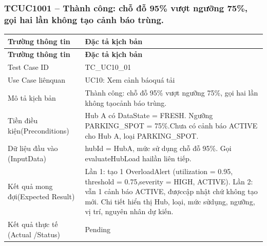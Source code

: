 \subsubsection{TCUC1001 – Thành công: chỗ đỗ 95\% vượt ngưỡng 75\%, gọi hai lần không tạo cảnh báo trùng.}
\begin{longtable}{|L{0.24\textwidth}|L{0.70\textwidth}|}
\hline
\textbf{Trường thông tin} & \textbf{Đặc tả kịch bản} \\
\hline
\endfirsthead
\hline
\textbf{Trường thông tin} & \textbf{Đặc tả kịch bản} \\
\hline
\endhead
Test Case ID & TC\_UC10\_01 \\
\hline
Use Case liênquan & UC10: Xem cảnh báoquá tải \\
\hline
Mô tả kịch bản & Thành công: chỗ đỗ 95\% vượt ngưỡng 75\%, gọi hai lần không tạo\newline cảnh báo trùng. \\
\hline
Tiền điều kiện\newline (Preconditions) & Hub A có DataState = FRESH. Ngưỡng PARKING\_SPOT = 75\%.\newline Chưa có cảnh báo ACTIVE cho Hub A, loại PARKING\_SPOT. \\
\hline
Dữ liệu đầu vào (Input\newline Data) & hubId = HubA, mức sử dụng chỗ đỗ 95\%. Gọi evaluateHubLoad hai\newline lần liên tiếp. \\
\hline
Kết quả mong đợi\newline (Expected Result) & Lần 1: tạo 1 OverloadAlert (utilization = 0.95, threshold = 0.75,\newline severity = HIGH, ACTIVE). Lần 2: vẫn 1 cảnh báo ACTIVE, được\newline cập nhật chứ không tạo mới. Chi tiết hiển thị Hub, loại, mức sử\newline dụng, ngưỡng, vị trí, nguyên nhân dự kiến. \\
\hline
Kết quả thực tế (Actual /\newline Status) & Pending \\
\hline
\end{longtable}
\vspace{-0.5\baselineskip}
